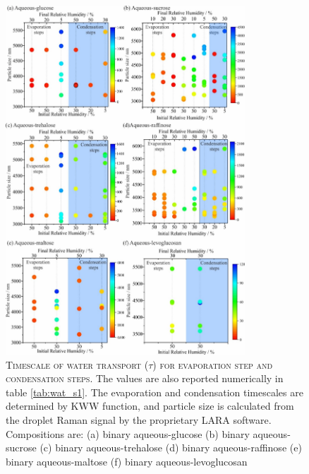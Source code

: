 \begin{figure}
    \centering
    \includegraphics[width=0.8\textwidth]{chapters/water_hopping/figures/image005.jpg}
    \caption[Timescale of water transport for evaporation step and condensation steps]{\textsc{Timescale of water transport ($\tau$) for evaporation step and condensation steps}. The values are also reported numerically in table \ref{tab:wat_s1}. The evaporation and condensation timescales are determined by KWW function, and particle size is calculated from the droplet Raman signal by the proprietary LARA software. Compositions are: (a) binary aqueous-glucose (b) binary aqueous-sucrose (c) binary aqueous-trehalose (d) binary aqueous-raffinose (e) binary aqueous-maltose (f) binary aqueous-levoglucosan}
    \label{fig:wat_s3}
\end{figure}

